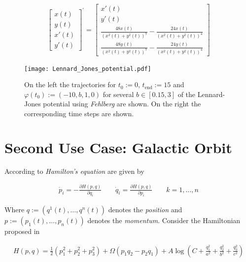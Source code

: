 \begin{gather}
	\begin{bmatrix}
		x(t)\\
		y(t)\\
		x'(t)\\
		y'(t)
	\end{bmatrix}^{'} 
	= \begin{bmatrix}
		x'(t)\\
		y'(t)\\
		\frac{48x(t)}{\left( x^2(t) + y^2(t) \right)^7} - \frac{24x(t)}{\left( x^2(t) + y^2(t) \right)^4}\\
		\frac{48y(t)}{\left( x^2(t) + y^2(t) \right)^7} - \frac{24y(t)}{\left( x^2(t) + y^2(t) \right)^4}	
	\end{bmatrix}
\end{gather}

\begin{figure}[h!tb]
	\centering
	\texttt{[image: Lennard\_Jones\_potential.pdf]}
	\caption[Integration Lennard-Jones potential]{On the left the trajectories for $t_0 := 0$, $t_{\mathrm{end}} := 15$ and $\varphi(t_0) := \left( -10, b , 1, 0 \right)$ for several $b \in [0.15,3]$ of the Lennard-Jones potential using \emph{Fehlberg} are shown. On the right the corresponding time steps are shown.}
\end{figure}

\section{Second Use Case: Galactic Orbit}
According to \cite[28--29]{QMM_TAKHTAJAN} \emph{Hamilton's equation} are given by 

\begin{gather}
	\boxed{\dot{p}_i = -\frac{\partial H(p,q)}{\partial q_i} \qquad \dot{q}_i = \frac{\partial H(p,q)}{\partial p_i} \qquad k = 1,\hdots,n} 
\end{gather}

Where $q := (q^1(t),\hdots,q^n(t))$ denotes the \emph{position} and $p := (p_1(t), \hdots,p_n(t))$ denotes the \emph{momentum}. Consider the Hamiltonian proposed in \cite[320]{ODE_I_HAIRER}

\begin{gather}
	\boxed{H(p,q) = \frac{1}{2}\left( p_1^2 + p_2^2 + p_3^2 \right) + \Omega \left( p_1q_2 - p_2 q_1 \right) + A \log \left( C + \frac{q_1^2}{a^2} + \frac{q_2^2}{b^2} + \frac{q_3^2}{c^2} \right) }
\end{gather}

